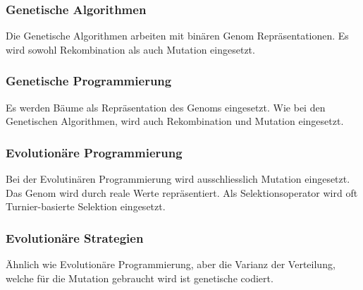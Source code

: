     \subsubsection{Genetische Algorithmen\label{item:genAlgo}}

      Die Genetische Algorithmen arbeiten mit binären Genom Repräsentationen.
      Es wird sowohl Rekombination als auch Mutation eingesetzt.

    \subsubsection{Genetische Programmierung\label{item:genProg}}

      Es werden Bäume als Repräsentation des Genoms eingesetzt. Wie bei den Genetischen Algorithmen,
      wird auch Rekombination und Mutation eingesetzt.

    \subsubsection{Evolutionäre Programmierung\label{item:evProg}}

      Bei der Evolutinären Programmierung wird ausschliesslich Mutation eingesetzt.
      Das Genom wird durch reale Werte repräsentiert. Als Selektionsoperator wird
      oft Turnier-basierte Selektion eingesetzt.

    \subsubsection{Evolutionäre Strategien\label{item:evStrat}}

        Ähnlich wie Evolutionäre Programmierung, aber die Varianz der Verteilung,
        welche für die Mutation gebraucht wird ist genetische codiert.
